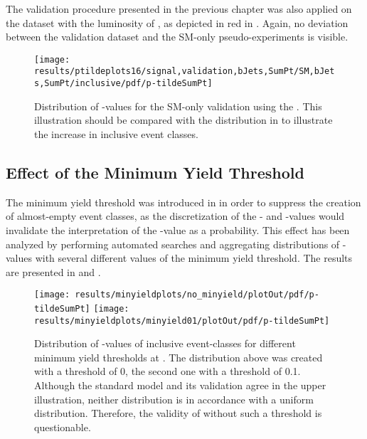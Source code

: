 The validation procedure presented in the previous chapter was also applied on the dataset with the luminosity of \lumiB, as depicted in red in . Again, no deviation between the validation dataset and the \ac{SM}-only pseudo-experiments is visible.

\begin{figure}
    \centering
    \texttt{[image: results/ptildeplots16/signal,validation,bJets,SumPt/SM,bJets,SumPt/inclusive/pdf/p-tildeSumPt]}
    \caption{Distribution of \ptilde-values for the \ac{SM}-only validation using the \lumiB. This illustration should be compared with the distribution in  to illustrate the increase in inclusive event classes.}
    \label{fig:result_lumi2016_ptilde}
\end{figure}

\pagebreak

\subsection{Effect of the Minimum Yield Threshold}
The minimum yield threshold was introduced in  in order to suppress the creation of almost-empty event classes, as the discretization of the \TS- and \ptilde-values would invalidate the interpretation of the \ptilde-value as a probability. This effect has been analyzed by performing automated searches and aggregating distributions of \ptilde-values with several different values of the minimum yield threshold. The results are presented in  and . 

\begin{figure}[p]
    \centering
    \texttt{[image: results/minyieldplots/no\_minyield/plotOut/pdf/p-tildeSumPt]}
    \texttt{[image: results/minyieldplots/minyield01/plotOut/pdf/p-tildeSumPt]}
    \caption{Distribution of \ptilde-values of inclusive event-classes for different minimum yield thresholds at \lumiA. The distribution above was created with a threshold of \num{0}, the second one with a threshold of \num{0.1}. Although the standard model and its validation agree in the upper illustration, neither distribution is in accordance with a uniform distribution. Therefore, the validity of \ptilde without such a threshold is questionable.}
    \label{fig:result_minyield_ptilde}
\end{figure}

